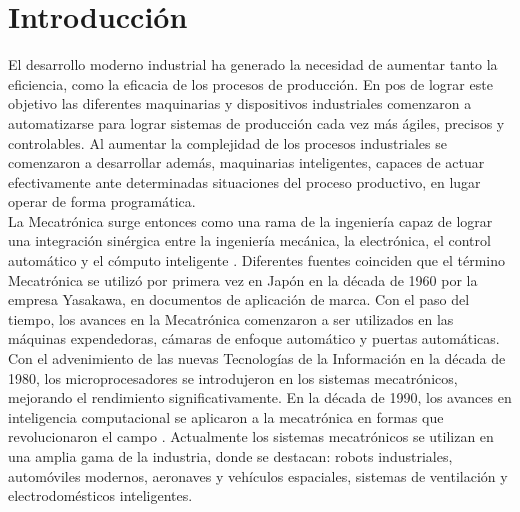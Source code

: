 
\chapter{Introducción} %

\label{Chapter1} %


\newcommand{\keyword}[1]{\textbf{#1}}
\newcommand{\tabhead}[1]{\textbf{#1}}
\newcommand{\code}[1]{\texttt{#1}}
\newcommand{\file}[1]{\texttt{\bfseries#1}}
\newcommand{\option}[1]{\texttt{\itshape#1}}

   
El desarrollo moderno industrial ha generado la necesidad de aumentar tanto la eficiencia, como la eficacia de los procesos de producción. En pos de lograr este objetivo las diferentes maquinarias y dispositivos industriales comenzaron a automatizarse para lograr sistemas de producción cada vez más ágiles, precisos y controlables. Al aumentar la complejidad de los procesos industriales se comenzaron a desarrollar además, maquinarias inteligentes, capaces de actuar efectivamente ante determinadas situaciones del proceso productivo, en lugar operar de forma programática. \\
La Mecatrónica surge entonces como una rama de la ingeniería capaz de lograr una integración sinérgica entre la ingeniería mecánica, la electrónica, el control  automático y el cómputo inteligente \cite{silva_mechatronics:_2010}. Diferentes fuentes coinciden que el término Mecatrónica se utilizó por primera vez en Japón en la década de 1960 por la empresa Yasakawa, en documentos de aplicación de marca. Con el paso del tiempo, los avances en la Mecatrónica comenzaron a ser utilizados en las máquinas expendedoras, cámaras de enfoque automático y puertas automáticas. Con el advenimiento de las nuevas Tecnologías de la Información en la década de 1980, los microprocesadores se introdujeron en los sistemas mecatrónicos, mejorando el rendimiento significativamente. En la década de 1990, los avances en inteligencia computacional se aplicaron a la mecatrónica en formas que revolucionaron el campo \cite{bishop_mechatronics_2002}. Actualmente los sistemas mecatrónicos se utilizan en una amplia gama de la industria, donde se destacan: robots industriales, automóviles modernos, aeronaves y vehículos espaciales, sistemas de ventilación y electrodomésticos inteligentes. 

